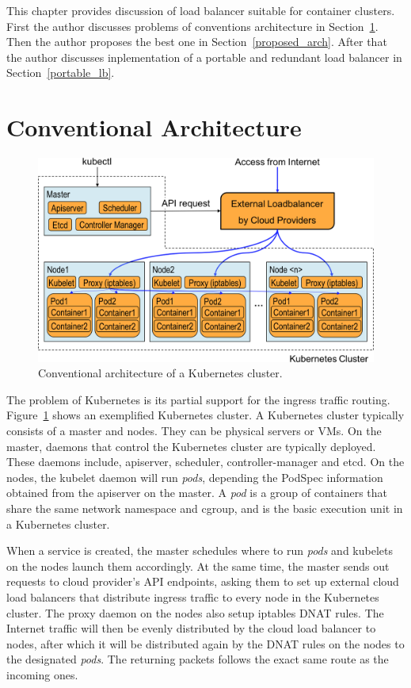 This chapter provides discussion of load balancer suitable for container clusters.
First the author discusses problems of conventions architecture in Section~\ref{problem_k8s}.
Then the author proposes the best one in Section~\ref{proposed_arch}.
After that the author discusses inplementation of  a portable and redundant load balancer in Section~\ref{portable_lb}. 


\section{Conventional Architecture}\label{problem_k8s}

\begin{figure}
  \centering
  \includegraphics[width=0.8\columnwidth]{Figs/K8sConventional}
  \caption{Conventional architecture of a Kubernetes cluster.}
  \label{fig:K8sConventional}
\end{figure}

The problem of Kubernetes is its partial support for the ingress traffic routing.
Figure~\ref{fig:K8sConventional} shows an exemplified Kubernetes cluster.
A Kubernetes cluster typically consists of a master and nodes. They can be physical servers or VMs.
On the master, daemons that control the Kubernetes cluster are typically deployed. 
These daemons include, apiserver, scheduler, controller-manager and etcd. 
On the nodes, the kubelet daemon will run {\it pods}, depending the PodSpec information obtained from the apiserver on the master.
A {\em pod} is a group of containers that share the same network namespace and cgroup,
and is the basic execution unit in a Kubernetes cluster.

When a service is created, the master schedules where to run {\em pods} and kubelets on the nodes launch them accordingly.
At the same time, the master sends out requests to cloud provider's API endpoints, asking them to set up external cloud load balancers that distribute ingress traffic to every node in the Kubernetes cluster.
The proxy daemon on the nodes also setup iptables DNAT\cite{MartinA.Brown2017} rules. 
The Internet traffic will then be evenly distributed by the cloud load balancer to nodes, 
after which it will be distributed again by the DNAT rules on the nodes to the designated {\em pods}. 
The returning packets follows the exact same route as the incoming ones.

